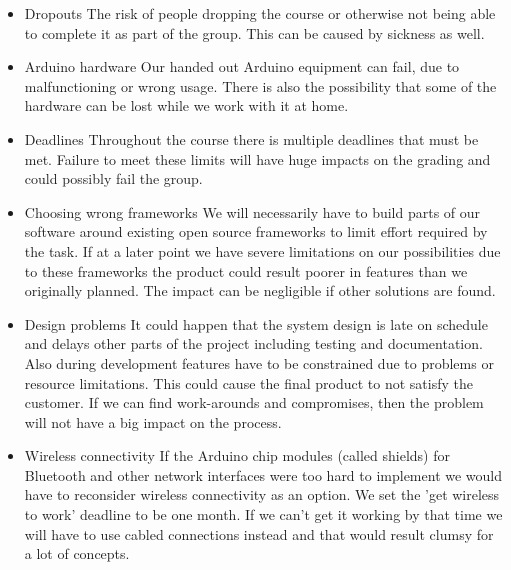 \begin{itemize}

\item{Dropouts}\newline
The risk of people dropping the course or otherwise not being able to complete it as part
of the group. This can be caused by sickness as well.

\item{Arduino hardware}\newline
Our handed out Arduino equipment can fail, due to malfunctioning or wrong usage.
There is also the possibility that some of the hardware can be lost while we work with it at home.

\item{Deadlines}\newline
Throughout the course there is multiple deadlines that must be met. Failure to meet
these limits will have huge impacts on the grading and could possibly fail the group.

\item{Choosing wrong frameworks}\newline
We will necessarily have to build parts of our software around existing open source
frameworks to limit effort required by the task. If at a later point we have severe limitations
on our possibilities due to these frameworks the product could result poorer in features than
we originally planned. The impact can be negligible if other solutions are found.

\item{Design problems}\newline
It could happen that the system design is late on schedule and delays other parts of the project
including testing and documentation. Also during development features have to be constrained due to problems
or resource limitations. This could cause the final product to not satisfy the customer.
If we can find work-arounds and compromises, then the problem will not have a big impact on the process.

\item{Wireless connectivity}\newline
If the Arduino chip modules (called shields) for Bluetooth and other network interfaces were too
hard to implement we would have to reconsider wireless connectivity as an option.
We set the 'get wireless to work' deadline to be one month. If we can't get it working
by that time we will have to use cabled connections instead and that would result clumsy
for a lot of concepts.
\end{itemize}

